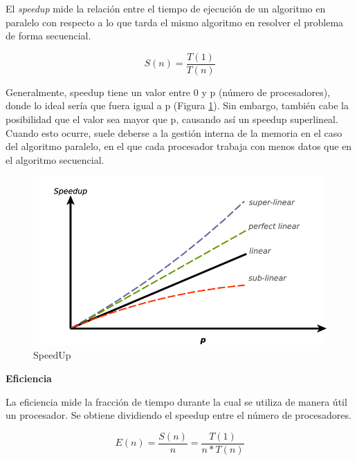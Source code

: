 El \emph{speedup} mide la relación entre el tiempo de ejecución de un algoritmo en paralelo con respecto a lo que tarda el mismo algoritmo en resolver el problema de forma secuencial.

\begin{equation*}
    S(n) = \frac{T(1)}{T(n)}
\end{equation*}

Generalmente, speedup tiene un valor entre 0 y p (número de procesadores), donde lo ideal sería que fuera igual a p (Figura \ref{speedup}). Sin embargo, también cabe la posibilidad que el valor sea mayor que p, causando así un speedup superlineal. Cuando esto ocurre, suele deberse a la gestión interna de la memoria en el caso del algoritmo paralelo, en el que cada procesador trabaja con menos datos que en el algoritmo secuencial.
\vspace{4mm}

\begin{figure}[htb]
   \centering
   \includegraphics[scale=0.3]{images/speedup.png}
   \caption{SpeedUp}
   \label{speedup}
\end{figure}

\vspace{4mm}
\textbf{Eficiencia}
\vspace{2mm}

La eficiencia mide la fracción de tiempo durante la cual se utiliza de manera útil un procesador. Se obtiene dividiendo el speedup entre el número de procesadores.

\vspace{2mm}
\begin{equation*}
    E(n) = \frac{S(n)}{n} = \frac{T(1)}{n*T(n)}
\end{equation*}
\vspace{2mm}

